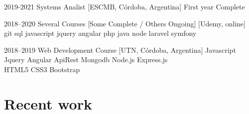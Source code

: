 \begin{twenty} %
        \twentyitem%
        {2019-2021}
        {Systems Analist}
        {[ESCMB, Córdoba, Argentina]}
        {First year Complete}
        
        \twentyitem%
        {2018--2020}
        {Several Courses [Some Complete / Others Ongoing]}
        {[Udemy, online]}
        {git sql javascript jquery angular php java node laravel symfony}
 	
 	\twentyitem%
 	{2018--2019}
 	{Web Development Course}
 	{[UTN, Córdoba, Argentina]}
 	{Javascript Jquery Angular ApiRest Mongodb Node.js Express.js\\
 	HTML5 CSS3 Bootstrap}
\end{twenty}

\section{Recent work}

\begin{twentyshort} %
\end{twentyshort}

